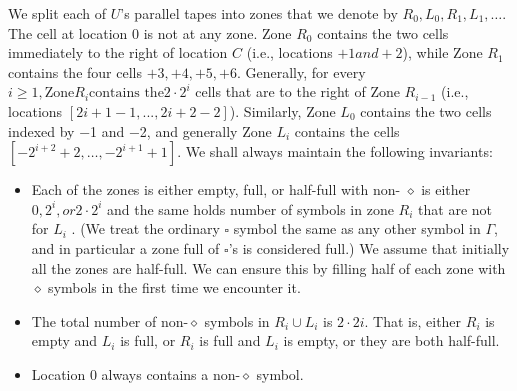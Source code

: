 \documentclass[a4paper,12pt]{article}
\begin{document}
	We split each of $U$’s parallel tapes into zones that we denote by
$R_0 , L_0 , R_1 , L_1 , \dotsc$. The cell at location 0 is not at any zone. Zone $R_0$ contains the two cells immediately to the right of location \(C\) (i.e.,
locations \(+1 and +2\)), while Zone \(R_1\) contains the four cells \(+3, +4, +5, +6\). Generally,
for every \(i ≥ 1, \text{Zone} R_i \text{contains the} 2 \cdot 2^i\) cells that are to the right of Zone $R_{i−1}$ (i.e.,
locations \([2 i+1 − 1, . . . , 2 i+2 − 2]\)). Similarly, Zone $L_0$ contains the two cells indexed by
−1 and −2, and generally Zone $L_i$ contains the cells $[−2^{i+2} + 2, \dotsc , −2^{i+1} + 1]$. We
shall always maintain the following invariants:
\begin{itemize}
\item Each of the zones is either empty, full, or half-full with non- 
$\diamond$ is either \(0, 2^i , or 2 \cdot 2^i\) and the same holds
number of symbols in zone $R_i$ that are not 
for $L_i$ . (We treat the ordinary $\square$ symbol the same as any other symbol in $\Gamma$, and in
particular a zone full of  $\square$’s is considered full.) We assume that initially all the zones are half-full. We can ensure this by filling half of each zone with $\diamond$ symbols in the first time we encounter it.
\item The total number of non-$\diamond$ symbols in $R_i \cup L_i$ is $2 \cdot 2 i$. That is, either $R_i$ is empty and $L_i$ is full, or $R_i$ is full and $L_i$ is empty, or they are both half-full.
\item Location 0 always contains a non-$\diamond$ symbol.
\end{itemize}
\end{document}

